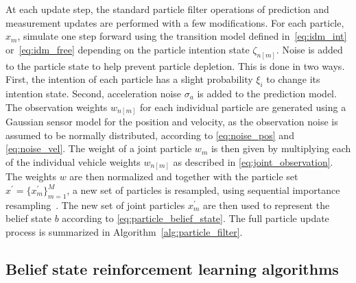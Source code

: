 At each update step, the standard particle filter operations of prediction and measurement updates are performed with a few modifications. 
For each particle, $x_m$, simulate one step forward using the transition model defined in~\eqref{eq:idm_int} or~\eqref{eq:idm_free} depending on the particle intention state $\zeta_{n[m]}$. 
Noise is added to the particle state to help prevent particle depletion. This is done in two ways.  
First, the intention of each particle has a slight probability $\xi_i$ to change its intention state. 
Second, acceleration noise $\sigma_a$ is added to the prediction model. 
The observation weights $w_{n[m]}$ for each individual particle are generated using a Gaussian sensor model for the position and velocity, as the observation noise is assumed to be normally distributed, according to \eqref{eq:noise_pos} and \eqref{eq:noise_vel}. The weight of a joint particle $w_{m}$ is then given by multiplying each of the individual vehicle weights $w_{n[m]}$ as described in \ref{eq:joint_observation}. 
The weights $w$ are then normalized and together with the particle set $x^\prime = \{x^\prime_{m}\}^M_{m=1}$, a new set of particles is resampled, using sequential importance resampling~\cite{gordon1993}. 
The new set of joint particles $x^\prime_m$ are then used to represent the belief state $b$ according to \eqref{eq:particle_belief_state}. The full particle update process is summarized in Algorithm~\ref{alg:particle_filter}.

\subsection{Belief state reinforcement learning algorithms}
\label{sec:belief_rl_algo}
%         
        
